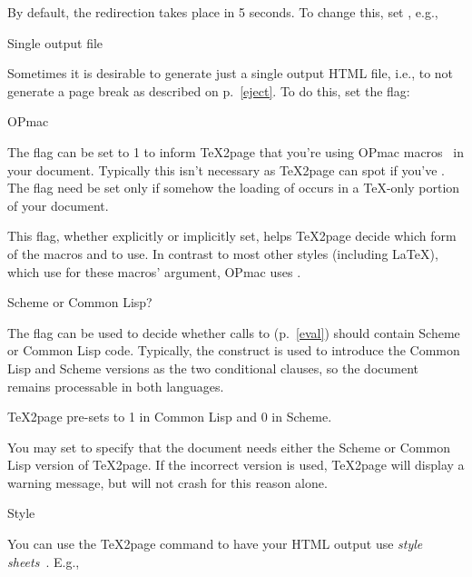 By default, the redirection takes place in 5 seconds. To change
this, set \p{\TZPredirectseconds}, e.g.,


\beginsection Single output file

%
Sometimes it is desirable to generate just a single output HTML
file, i.e., to not generate a page break as described on
p.~\ref{eject}. To do this, set the \p{\TZPsinglepage} flag:


\beginsection OPmac

The flag \p{\TZPopmac} can be set to 1 to inform \TeX2page that
you’re using OPmac macros~\cite{opmac} in your document.
Typically this isn't necessary as \TeX2page can spot if you’ve
\p{}. The flag need be set only if somehow the
loading of  occurs in a \TeX-only portion of your
document.

This flag, whether explicitly or implicitly set, helps \TeX2page
decide which form of the macros \p{\cite} and \p{\nocite} to use.
In contrast to most other styles (including \LaTeX), which use
\p{{}} for these macros' argument, OPmac uses \p{[]}.

\beginsection Scheme or Common Lisp?

The flag \p{\TZPcommonlisp} can be used to decide whether calls to
\p{\eval} (p.~\ref{eval}) should contain Scheme or Common Lisp code.
Typically, the construct  is used to introduce
the Common Lisp and Scheme versions as the two conditional clauses, so
the document remains processable in both languages.

\TeX2page pre-sets \p{\TZPcommonlisp} to 1 in Common Lisp and 0 in Scheme.

You may set \p{\TZPcommonlisp} to specify that the document needs
either the Scheme or Common Lisp version of \TeX2page. If
the incorrect version is used, \TeX2page will display a warning
message, but will not crash for this reason alone.

 Style

%
You can use the \TeX2page command  to have your HTML output use {\em style
sheets}~\cite{w3c:css,lb:css,htmlhelp:css}.  E.g.,


